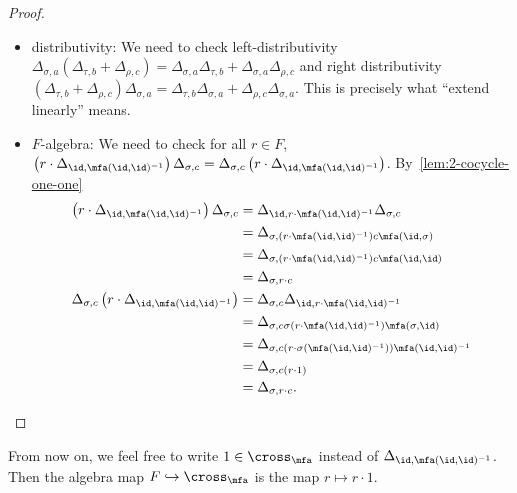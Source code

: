 \begin{proof}
\begin{itemize}
\[\begin{aligned}
            &= \Delta_{\sigma, a\sigma(\mathfrak{a}(\id,\id))^{-1}\mathfrak{a}(\sigma,\id)}\\
            &=\Delta_{\sigma, a\sigma(\mfa(\id,\id))^{-1}\sigma(\mfa(\id, id))}\\
            &=\Delta_{\sigma, a}
          \end{aligned}
          \]
    \item distributivity: We need to check left-distributivity $\Delta_{\sigma, a}\left(\Delta_{\tau, b} + \Delta_{\rho, c}\right) = \Delta_{\sigma,a}\Delta_{\tau,b} + \Delta_{\sigma, a}\Delta_{\rho, c}$ and right distributivity $\left(\Delta_{\tau,b} + \Delta_{\rho,c}\right)\Delta_{\sigma,a} = \Delta_{\tau,b}\Delta_{\sigma,a} + \Delta_{\rho,c}\Delta_{\sigma,a}$. This is precisely what ``extend linearly'' means.
    \item $F$-algebra: We need to check for all $r \in F$, $\left(r\cdot \Delta_{\id,\mfa(\id,\id)^{-1}}\right)\Delta_{\sigma,c} = \Delta_{\sigma,c}\left(r\cdot\Delta_{\id,\mfa(\id,\id)^{-1}}\right)$. By~\cref{lem:2-cocycle-one-one}
          \[
          \begin{aligned}
            \left(r\cdot \Delta_{\id,\mfa(\id,\id)^{-1}}\right)\Delta_{\sigma,c}
            &= \Delta_{\id,r\cdot\mfa(\id,\id)^{-1}}\Delta_{\sigma,c}\\
            &= \Delta_{\sigma,\left(r\cdot\mfa(\id,\id)^{-1}\right)c\mfa(\id,\sigma)} \\
            &=\Delta_{\sigma,\left(r\cdot\mfa(\id,\id)^{-1}\right)c\mfa(\id,\id)} \\
            &= \Delta_{\sigma, r\cdot c}\\
            \Delta_{\sigma,c}\left(r\cdot\Delta_{\id,\mfa(\id,\id)^{-1}}\right)
            &= \Delta_{\sigma,c}\Delta_{\id,r\cdot \mfa(\id,\id)^{-1}} \\
            &= \Delta_{\sigma,c\sigma\left(r\cdot\mfa(\id,\id)^{-1}\right)\mfa(\sigma,\id)}\\
            &=\Delta_{\sigma,c\left(r\cdot\sigma\left(\mfa(\id,\id)^{-1}\right)\right)\mfa(\id,\id)^{-1}}\\
            &= \Delta_{\sigma, c\left(r\cdot 1\right)}\\
            &=\Delta_{\sigma,r\cdot c}.
          \end{aligned}
          \]
  \end{itemize}
\end{proof}

From now on, we feel free to write $1 \in \cross_{\mfa}$ instead of $\Delta_{\id,\mfa(\id,\id)^{-1}}$. Then the algebra map $F \hookrightarrow \cross_{\mfa}$ is the map $r \mapsto r \cdot 1$.

